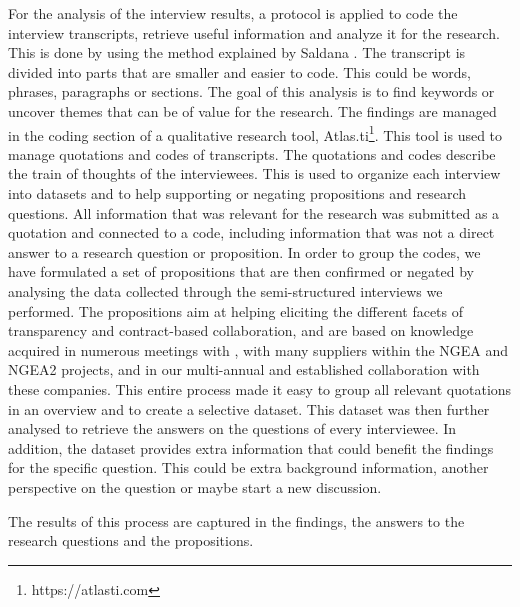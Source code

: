  For the analysis of the interview results, a protocol is applied to code the interview transcripts, retrieve useful information and analyze it for the research. This is done by using the method explained by Saldana \cite{saldana2015coding}. The transcript is divided into parts that are smaller and easier to code. This could be words, phrases, paragraphs or sections. The goal of this analysis is to find keywords or uncover themes that can be of value for the research. The findings are managed in the coding section of a qualitative research tool, Atlas.ti\footnote{https://atlasti.com}. %
This tool is used to manage quotations and codes of transcripts. The quotations and codes describe the train of thoughts of the interviewees. This is used to organize each interview into datasets and to help supporting or negating propositions and research questions. All information that was relevant for the research was submitted as a quotation and connected to a code, including information that was not a direct answer to a research question or proposition. 
In order to group the codes, we have formulated a set of propositions that are then confirmed or negated by analysing the data collected through the semi-structured interviews we performed.
The propositions aim at helping eliciting the different facets of transparency and contract-based collaboration, and are based on knowledge acquired in numerous meetings with \company{}, with many suppliers within the NGEA and NGEA2 projects,
and in our multi-annual and established collaboration with these companies. 
This entire process made it easy to group all relevant quotations in an overview and to create a selective dataset. %
This dataset was then further analysed to retrieve the answers on the questions of every interviewee. In addition, the dataset provides extra information that could benefit the findings for the specific question. This could be extra background information, another perspective on the question or maybe start a new discussion. 

The results of this process are captured in the findings, the answers to the research questions and the propositions.

